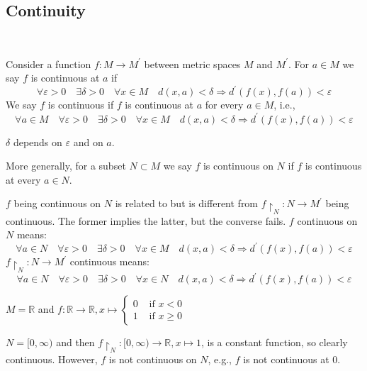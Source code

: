 \documentclass[a4paper]{article}
\begin{document}
\subsection{Continuity}\ \vspace{-1.5em}
\begin{definition}
    Consider a function $f: M \rightarrow M^{\prime}$ between metric spaces $M$ and $M^{\prime}$. For $a \in M$ we say $f$ is continuous at $a$ if
    \[
    \forall \varepsilon>0 \quad \exists \delta>0 \quad \forall x \in M \quad d(x, a)<\delta \Longrightarrow d^{\prime}(f(x), f(a))<\varepsilon
    \]
    We say $f$ is continuous if $f$ is continuous at $a$ for every $a \in M$, i.e.,
    \[
    \forall a \in M \quad \forall \varepsilon>0 \quad \exists \delta>0 \quad \forall x \in M \quad d(x, a)<\delta \Longrightarrow d^{\prime}(f(x), f(a))<\varepsilon
    \]
\end{definition}
\begin{note}
    $\delta$ depends on $\varepsilon$ and on $a$.
\end{note}
More generally, for a subset $N \subset M$ we say $f$ is continuous on $N$ if $f$ is continuous at every $a \in N$.
\begin{note}
    $f$ being continuous on $N$ is related to but is different from $f\restriction_N: N \rightarrow M^{\prime}$ being continuous. The former implies the latter, but the converse fails.
$f$ continuous on $N$ means:
    \[
        \forall a \in N \quad \forall \varepsilon>0 \quad \exists \delta>0 \quad \forall x \in M \quad d(x, a)<\delta \Longrightarrow d^{\prime}(f(x), f(a))<\varepsilon
    \]
    $f\restriction_N: N \rightarrow M^{\prime}$ continuous means:
    \[
        \forall a \in N \quad \forall \varepsilon>0 \quad \exists \delta>0 \quad \forall x \in N \quad d(x, a)<\delta \Longrightarrow d^{\prime}(f(x), f(a))<\varepsilon
    \]
\end{note}

\begin{example}
$M=\mathbb{R}$ and $f: \mathbb{R} \rightarrow \mathbb{R}, x \mapsto \begin{cases}0 & \text { if } x<0 \\ 1 & \text { if } x \geqslant 0\end{cases}$

$N=[0, \infty)$ and then $f\restriction_N:[0, \infty) \rightarrow \mathbb{R}, x \mapsto 1$, is a constant function, so clearly continuous. However, $f$ is not continuous on $N$, e.g., $f$ is not continuous at 0.
\end{example}
\end{document}
